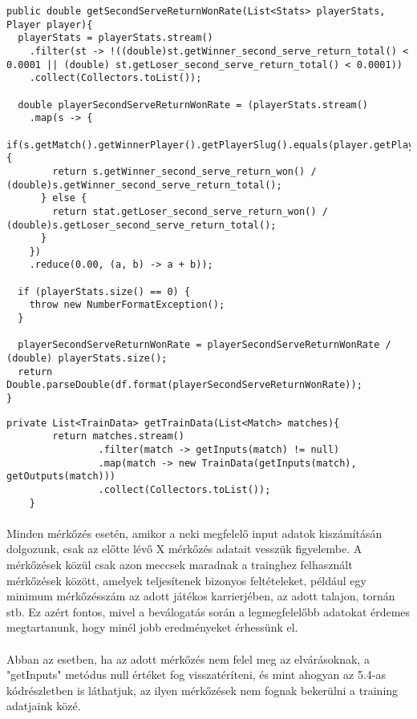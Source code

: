 \begin{lstlisting}[caption= A második adogatások utáni pontok győzelmi rátája fogadóként]
public double getSecondServeReturnWonRate(List<Stats> playerStats, Player player){
  playerStats = playerStats.stream()
    .filter(st -> !((double)st.getWinner_second_serve_return_total() < 0.0001 || (double) st.getLoser_second_serve_return_total() < 0.0001))
    .collect(Collectors.toList());

  double playerSecondServeReturnWonRate = (playerStats.stream()
    .map(s -> {
      if(s.getMatch().getWinnerPlayer().getPlayerSlug().equals(player.getPlayerSlug())){
        return s.getWinner_second_serve_return_won() / (double)s.getWinner_second_serve_return_total();
      } else {
        return stat.getLoser_second_serve_return_won() / (double)s.getLoser_second_serve_return_total();
      }
    })
    .reduce(0.00, (a, b) -> a + b));

  if (playerStats.size() == 0) {
    throw new NumberFormatException();
  }

  playerSecondServeReturnWonRate = playerSecondServeReturnWonRate / (double) playerStats.size();
  return Double.parseDouble(df.format(playerSecondServeReturnWonRate));
}
\end{lstlisting}

\begin{lstlisting}[caption= Az adatbázisban talált mérkőzések training adatokká való átalakítása]
    private List<TrainData> getTrainData(List<Match> matches){
        return matches.stream()
                .filter(match -> getInputs(match) != null)
                .map(match -> new TrainData(getInputs(match), getOutputs(match)))
                .collect(Collectors.toList());
    }
\end{lstlisting}

\paragraph{}
Minden mérkőzés esetén, amikor a neki megfelelő input adatok kiszámításán dolgozunk, csak az előtte lévő X mérkőzés adatait vesszük figyelembe. A mérkőzések közül csak azon meccsek maradnak a trainghez felhasznált mérkőzések között, amelyek teljesítenek bizonyos feltételeket, például egy minimum mérkőzésszám az adott játékos karrierjében, az adott talajon, tornán stb. Ez azért fontos, mivel a beválogatás során a legmegfelelőbb adatokat érdemes megtartanunk, hogy minél jobb eredményeket érhessünk el.

\paragraph{}
Abban az esetben, ha az adott mérkőzés nem felel meg az elvárásoknak, a "getInputs" metódus null értéket fog visszatéríteni, és mint ahogyan az 5.4-as kódrészletben is láthatjuk, az ilyen mérkőzések nem fognak bekerülni a training adatjaink közé.

